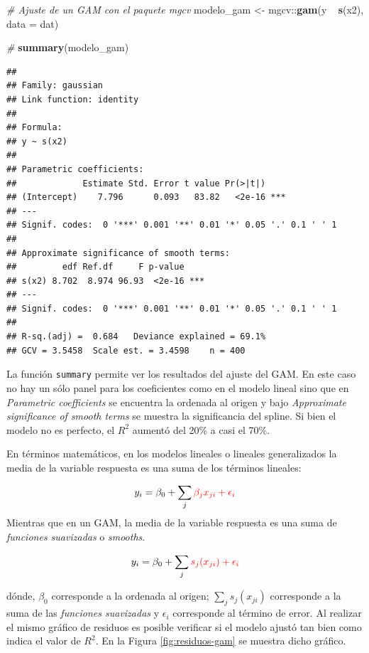 \documentclass[
  12pt]{article}
\newenvironment{Shaded}{}{}
\newcommand{\CommentTok}[1]{\textcolor[rgb]{0.38,0.63,0.69}{\textit{#1}}}
\newcommand{\DataTypeTok}[1]{\textcolor[rgb]{0.56,0.13,0.00}{#1}}
\newcommand{\KeywordTok}[1]{\textcolor[rgb]{0.00,0.44,0.13}{\textbf{#1}}}
\newcommand{\NormalTok}[1]{#1}
\newcommand{\OperatorTok}[1]{\textcolor[rgb]{0.40,0.40,0.40}{#1}}
\newcommand{\StringTok}[1]{\textcolor[rgb]{0.25,0.44,0.63}{#1}}
\begin{document}
\begin{Shaded}
\begin{Highlighting}[]
\CommentTok{# Ajuste de un GAM con el paquete mgcv}
\NormalTok{modelo_gam <-}\StringTok{ }\NormalTok{mgcv}\OperatorTok{::}\KeywordTok{gam}\NormalTok{(y }\OperatorTok{~}\StringTok{ }\KeywordTok{s}\NormalTok{(x2), }\DataTypeTok{data =}\NormalTok{ dat)}

\CommentTok{#}
\KeywordTok{summary}\NormalTok{(modelo_gam)}
\end{Highlighting}
\end{Shaded}

\begin{verbatim}
## 
## Family: gaussian 
## Link function: identity 
## 
## Formula:
## y ~ s(x2)
## 
## Parametric coefficients:
##             Estimate Std. Error t value Pr(>|t|)    
## (Intercept)    7.796      0.093   83.82   <2e-16 ***
## ---
## Signif. codes:  0 '***' 0.001 '**' 0.01 '*' 0.05 '.' 0.1 ' ' 1
## 
## Approximate significance of smooth terms:
##         edf Ref.df     F p-value    
## s(x2) 8.702  8.974 96.93  <2e-16 ***
## ---
## Signif. codes:  0 '***' 0.001 '**' 0.01 '*' 0.05 '.' 0.1 ' ' 1
## 
## R-sq.(adj) =  0.684   Deviance explained = 69.1%
## GCV = 3.5458  Scale est. = 3.4598    n = 400
\end{verbatim}

La función \texttt{summary} permite ver los resultados del ajuste del GAM. En este caso no hay un sólo panel para los coeficientes como en el modelo lineal sino que en \emph{Parametric coefficients} se encuentra la ordenada al origen y bajo \emph{Approximate significance of smooth terms} se muestra la significancia del spline. Si bien el modelo no es perfecto, el \(R^2\) aumentó del 20\% a casi el 70\%.

En términos matemáticos, en los modelos lineales o lineales generalizados la media de la variable respuesta es una suma de los términos lineales:

\[
y_i = \beta_0 +\sum_j \color{red}{ \beta_j x_{ji}} +\epsilon_i
\]
Mientras que en un GAM, la media de la variable respuesta es una suma de \emph{funciones suavizadas} o \emph{smooths}.

\[
y_i = \beta_0 + \sum_j \color{red}{s_j(x_{ji})} + \epsilon_i
\]

dónde, \(\beta_0\) corresponde a la ordenada al origen; \(\sum_j {s_j(x_{ji})}\) corresponde a la suma de las \emph{funciones suavizadas} y \(\epsilon_i\) corresponde al término de error.
Al realizar el mismo gráfico de residuos es posible verificar si el modelo ajustó tan bien como indica el valor de \(R^2\). En la Figura \ref{fig:residuos-gam} se muestra dicho gráfico.
\end{document}
